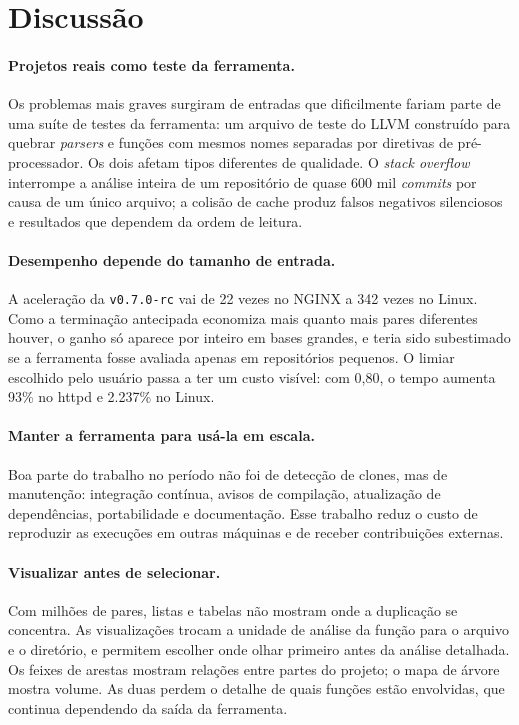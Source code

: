 \documentclass{article}
\newcommand{\scene}[2]{\todo[size=\tiny,color=blue!10]{#1 (#2)}}
\newcommand{\vnova}{\texttt{v0.7.0-rc}}
\begin{document}
\section{Discussão}

\scene{Scene 5}{7:45--9:30}

\paragraph{Projetos reais como teste da ferramenta.}
Os problemas mais graves surgiram de entradas que dificilmente fariam parte de uma suíte de testes da ferramenta: um arquivo de teste do \textsc{LLVM} construído para quebrar \emph{parsers} e funções com mesmos nomes separadas por diretivas de pré-processador. Os dois afetam tipos diferentes de qualidade. O \emph{stack overflow} interrompe a análise inteira de um repositório de quase 600 mil \textit{commits} por causa de um único arquivo; a colisão de cache produz falsos negativos silenciosos e resultados que dependem da ordem de leitura.

\paragraph{Desempenho depende do tamanho de entrada.}
A aceleração da \vnova{} vai de 22 vezes no \textsc{NGINX} a 342 vezes no Linux. Como a terminação antecipada economiza mais quanto mais pares diferentes houver, o ganho só aparece por inteiro em bases grandes, e teria sido subestimado se a ferramenta fosse avaliada apenas em repositórios pequenos. O limiar escolhido pelo usuário passa a ter um custo visível: com 0,80, o tempo aumenta 93\% no httpd e 2.237\% no Linux.

\paragraph{Manter a ferramenta para usá-la em escala.}
Boa parte do trabalho no período não foi de detecção de clones, mas de manutenção: integração contínua, avisos de compilação, atualização de dependências, portabilidade e documentação. Esse trabalho reduz o custo de reproduzir as execuções em outras máquinas e de receber contribuições externas.

\paragraph{Visualizar antes de selecionar.}
Com milhões de pares, listas e tabelas não mostram onde a duplicação se concentra. As visualizações trocam a unidade de análise da função para o arquivo e o diretório, e permitem escolher onde olhar primeiro antes da análise detalhada. Os feixes de arestas mostram relações entre partes do projeto; o mapa de árvore mostra volume. As duas perdem o detalhe de quais funções estão envolvidas, que continua dependendo da saída da ferramenta.
\end{document}

